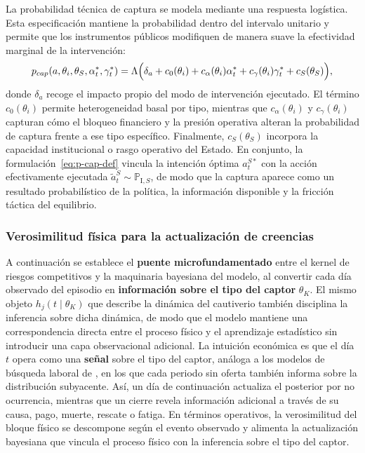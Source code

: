 \documentclass[12pt]{article}
\providecommand{\textcite}{\citet}
\theoremstyle{definition}
\theoremstyle{remark}
\newcommand{\ProbI}[1]{\mathbb{P}_{\mathrm{I},#1}}
\newcommand{\1}{\mathbf{1}}
\begin{document}
La probabilidad técnica de captura se modela mediante una respuesta logística. Esta especificación mantiene la probabilidad dentro del intervalo unitario y permite que los instrumentos públicos modifiquen de manera suave la efectividad marginal de la intervención:
\begin{equation}
\label{eq:p-cap-tecnica}
p_{cap}(a, \theta_i, \theta_S, \alpha_t^\ast, \gamma_t^\ast) = \Lambda\Bigl( \delta_a + c_0(\theta_i) + c_\alpha(\theta_i)\alpha_t^\ast + c_\gamma(\theta_i)\gamma_t^\ast + c_S(\theta_S) \Bigr),
\end{equation}
donde $\delta_a$ recoge el impacto propio del modo de intervención ejecutado. El término $c_0(\theta_i)$ permite heterogeneidad basal por tipo, mientras que $c_\alpha(\theta_i)$ y $c_\gamma(\theta_i)$ capturan cómo el bloqueo financiero y la presión operativa alteran la probabilidad de captura frente a ese tipo específico. Finalmente, $c_S(\theta_S)$ incorpora la capacidad institucional o rasgo operativo del Estado. En conjunto, la formulación~\eqref{eq:p-cap-def} vincula la intención óptima $a_t^{S\ast}$ con la acción efectivamente ejecutada $\tilde{a}_t^S \sim \ProbI{S}$, de modo que la captura aparece como un resultado probabilístico de la política, la información disponible y la fricción táctica del equilibrio.


\subsubsection{Verosimilitud física para la actualización de creencias}
\label{subsec:verosimilitud-fisica}

A continuación se establece el \textbf{puente microfundamentado} entre el kernel de riesgos competitivos y la maquinaria bayesiana del modelo, al convertir cada día observado del episodio en \textbf{información sobre el tipo del captor} $\theta_K$. El mismo objeto $h_j(t\mid\theta_K)$ que describe la dinámica del cautiverio también disciplina la inferencia sobre dicha dinámica, de modo que el modelo mantiene una correspondencia directa entre el proceso físico y el aprendizaje estadístico sin introducir una capa observacional adicional. La intuición económica es que el día $t$ opera como una \textbf{señal} sobre el tipo del captor, análoga a los modelos de búsqueda laboral de \textcite{McCall1970}, en los que cada periodo sin oferta también informa sobre la distribución subyacente. Así, un día de continuación actualiza el posterior por no ocurrencia, mientras que un cierre revela información adicional a través de su causa, pago, muerte, rescate o fatiga. En términos operativos, la verosimilitud del bloque físico se descompone según el evento observado y alimenta la actualización bayesiana que vincula el proceso físico con la inferencia sobre el tipo del captor.
\end{document}
